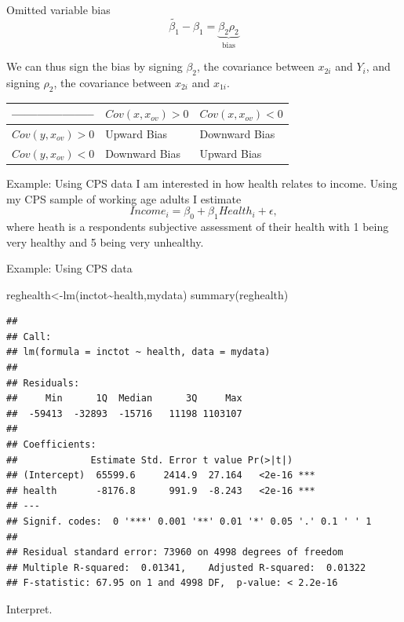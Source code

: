 \documentclass[
  ignorenonframetext,
]{beamer}
\newenvironment{Shaded}{\begin{snugshade}}{\end{snugshade}}
\newcommand{\FunctionTok}[1]{\textcolor[rgb]{0.00,0.00,0.00}{#1}}
\newcommand{\NormalTok}[1]{#1}
\newcommand{\OtherTok}[1]{\textcolor[rgb]{0.56,0.35,0.01}{#1}}
\newcommand{\SpecialCharTok}[1]{\textcolor[rgb]{0.00,0.00,0.00}{#1}}
\begin{document}
\begin{frame}{Omitted variable bias}
\protect\hypertarget{omitted-variable-bias-1}{}
\[
\tilde{\beta_1}-\beta_1=\underbrace{\beta_2 \rho_2}_\text{bias}
\]

We can thus sign the bias by signing \(\beta_2\), the covariance between
\(x_{2i}\) and \(Y_i\), and signing \(\rho_2\), the covariance between
\(x_{2i}\) and \(x_{1i}\).

\begin{longtable}[]{@{}lll@{}}
\toprule()
-------------------- & \(Cov(x,x_{ov})>0\) & \(Cov(x,x_{ov})<0\) \\
\midrule()
\endhead
\(Cov(y,x_{ov})>0\) & Upward Bias & Downward Bias \\
\(Cov(y,x_{ov})<0\) & Downward Bias & Upward Bias \\
\bottomrule()
\end{longtable}
\end{frame}

\begin{frame}{Example: Using CPS data}
\protect\hypertarget{example-using-cps-data}{}
I am interested in how health relates to income. Using my CPS sample of
working age adults I estimate \[
Income_i=\beta_0+\beta_1Health_i+\epsilon, 
\] where heath is a respondents subjective assessment of their health
with 1 being very healthy and 5 being very unhealthy.
\end{frame}

\begin{frame}[fragile]{Example: Using CPS data}
\protect\hypertarget{example-using-cps-data-1}{}
\tiny

\begin{Shaded}
\begin{Highlighting}[]
\NormalTok{reghealth}\OtherTok{\textless{}{-}}\FunctionTok{lm}\NormalTok{(inctot}\SpecialCharTok{\textasciitilde{}}\NormalTok{health,mydata)}
\FunctionTok{summary}\NormalTok{(reghealth)}
\end{Highlighting}
\end{Shaded}

\begin{verbatim}
## 
## Call:
## lm(formula = inctot ~ health, data = mydata)
## 
## Residuals:
##     Min      1Q  Median      3Q     Max 
##  -59413  -32893  -15716   11198 1103107 
## 
## Coefficients:
##             Estimate Std. Error t value Pr(>|t|)    
## (Intercept)  65599.6     2414.9  27.164   <2e-16 ***
## health       -8176.8      991.9  -8.243   <2e-16 ***
## ---
## Signif. codes:  0 '***' 0.001 '**' 0.01 '*' 0.05 '.' 0.1 ' ' 1
## 
## Residual standard error: 73960 on 4998 degrees of freedom
## Multiple R-squared:  0.01341,    Adjusted R-squared:  0.01322 
## F-statistic: 67.95 on 1 and 4998 DF,  p-value: < 2.2e-16
\end{verbatim}

\normalsize

Interpret.
\end{frame}
\end{document}

